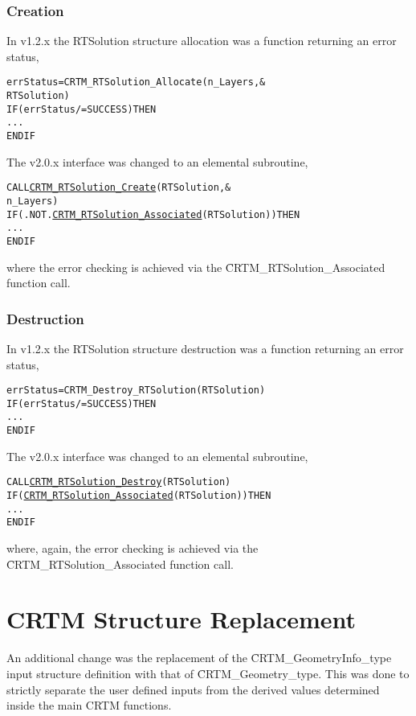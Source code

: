 \subsubsection{Creation}
In v1.2.x the RTSolution structure allocation was a function returning an error status,
\begin{alltt}
  errStatus = CRTM_RTSolution_Allocate( n_Layers  , &
                                        RTSolution  )
  IF ( errStatus /= SUCCESS ) THEN
    ...
  END IF\end{alltt}
The v2.0.x interface was changed to an elemental subroutine,
\begin{alltt}
  CALL \hyperref[sec:CRTM_RTSolution_Create_interface]{CRTM_RTSolution_Create}( RTSolution, &
                               n_Layers    )
  IF ( .NOT. \hyperref[sec:CRTM_RTSolution_Associated_interface]{CRTM_RTSolution_Associated}( RTSolution ) ) THEN
    ...
  END IF\end{alltt}
where the error checking is achieved via the \f{CRTM\_RTSolution\_Associated} function call.


\subsubsection{Destruction}
In v1.2.x the RTSolution structure destruction was a function returning an error status,
\begin{alltt}
  errStatus = CRTM_Destroy_RTSolution( RTSolution )
  IF ( errStatus /= SUCCESS ) THEN
    ...
  END IF\end{alltt}
The v2.0.x interface was changed to an elemental subroutine,
\begin{alltt}
  CALL \hyperref[sec:CRTM_RTSolution_Destroy_interface]{CRTM_RTSolution_Destroy}( RTSolution )
  IF ( \hyperref[sec:CRTM_RTSolution_Associated_interface]{CRTM_RTSolution_Associated}( RTSolution ) ) THEN
    ...
  END IF\end{alltt}
where, again, the error checking is achieved via the \f{CRTM\_RTSolution\_Associated} function call.


\section{CRTM Structure Replacement}
\label{sec:mp_crtm_struct_replace}

An additional change was the replacement of the \f{CRTM\_GeometryInfo\_type} input structure definition with that of \f{CRTM\_Geometry\_type}. This was done to strictly separate the user defined inputs from the derived values determined inside the main CRTM functions.

